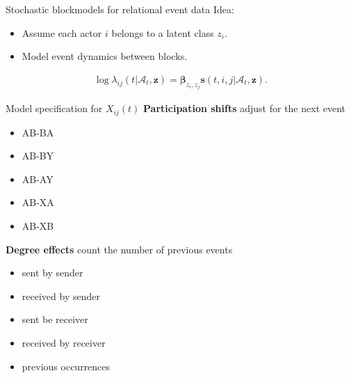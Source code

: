 \documentclass{beamer}
\begin{document}
\begin{frame}{Stochastic blockmodels for relational event data}
Idea:
  \begin{itemize}
  \item Assume each actor $i$ belongs to a latent class $z_i$.
  \item Model event dynamics between blocks.
  \end{itemize}

\begin{align}
\log \lambda_{ij}(t | \mathcal{A}_t,\mathbf{z}) = \boldsymbol{\beta}_{z_i,z_j} \mathbf{s}(t,i,j|\mathcal{A}_t,\mathbf{z}).
\end{align}



\end{frame}

\begin{frame}{Model specification for $X_{ij}(t)$}
\textbf{Participation shifts} adjust for the next event
\begin{itemize}
\item AB-BA
\item AB-BY
\item AB-AY
\item AB-XA
\item AB-XB
\end{itemize}

\textbf{Degree effects} count the number of previous events
\begin{itemize}
\item sent by sender
\item received by sender
\item sent be receiver
\item received by receiver
\item previous occurrences
\end{itemize}

\end{frame}
\end{document}
